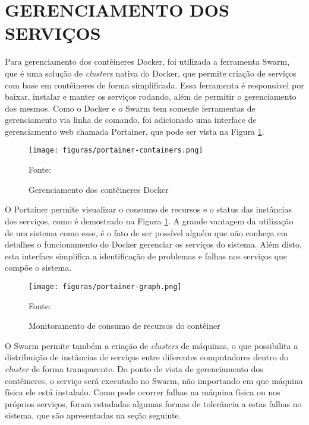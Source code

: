 \section{GERENCIAMENTO DOS SERVIÇOS}

Para gerenciamento dos contêineres Docker, foi utilizada a ferramenta Swarm,
que é uma solução de \emph{clusters} nativa do Docker, que permite criação de
serviços com base em contêineres de forma simplificada. Essa ferramenta é
responsável por baixar, instalar e manter os serviços rodando, além de
permitir o gerenciamento dos mesmos. Como o Docker e o Swarm tem somente
ferramentas de gerenciamento via linha de comando, foi adicionado uma
interface de gerenciamento web chamada Portainer, que pode ser vista na Figura
\ref{fig:portainer-containers}.

\begin{figure}[H]
	\centering
	\caption{Gerenciamento dos contêineres Docker}
	\texttt{[image: figuras/portainer-containers.png]}

	\label{fig:portainer-containers}
	\footnotesize Fonte: \fonteOAutor
\end{figure}

O Portainer permite visualizar o consumo de recursos e o status das instâncias
dos serviços, como é demostrado na Figura \ref{fig:portainer-containers}.
A grande vantagem da utilização de um sistema como esse, é o fato de ser
possível alguém que não conheça em detalhes o funcionamento do Docker gerenciar
os serviços do sistema. Além disto, esta interface simplifica a identificação
de problemas e falhas nos serviços que compõe o sistema.

\begin{figure}[H]
	\centering
	\caption{Monitoramento de consumo de recursos do contêiner}
	\texttt{[image: figuras/portainer-graph.png]}

	\label{fig:portainer-graph}
	\footnotesize Fonte: \fonteOAutor
\end{figure}

O Swarm permite também a criação de \emph{clusters} de máquinas, o que
possibilita a distribuição de instâncias de serviços entre diferentes
computadores dentro do \emph{cluster} de forma transparente. Do ponto de
vista de gerenciamento dos contêineres, o serviço será executado no
Swarm, não importando em que máquina física ele está instalado. Como pode
ocorrer falhas na máquina física ou nos próprios serviços, foram estudadas
algumas formas de tolerância a estas falhas no sistema, que são apresentadas
na seção seguinte.

